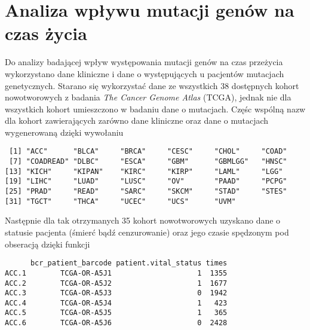 \newpage

\section{Analiza wpływu mutacji genów na czas życia}\label{chap:analiza}

Do analizy badającej wpływ występowania mutacji genów na czas przeżycia
wykorzystano dane kliniczne i dane o występujących u pacjentów mutacjach
genetycznych. Starano się wykorzystać dane ze wszystkich 38 dostępnych
kohort nowotworowych z badania \textit{The Cancer Genome Atlas} (TCGA),
jednak nie dla wszystkich kohort umieszczono w badaniu dane o mutacjach.
Częśc wspólną nazw dla kohort zawierających zarówno dane kliniczne oraz
dane o mutacjach wygenerowaną dzięki wywołaniu

\begin{Shaded}
\begin{Highlighting}[]
\NormalTok{(}\NormalTok{() ->}\StringTok{ }
\end{Highlighting}
\end{Shaded}

\begin{verbatim}
 [1] "ACC"      "BLCA"     "BRCA"     "CESC"     "CHOL"     "COAD"    
 [7] "COADREAD" "DLBC"     "ESCA"     "GBM"      "GBMLGG"   "HNSC"    
[13] "KICH"     "KIPAN"    "KIRC"     "KIRP"     "LAML"     "LGG"     
[19] "LIHC"     "LUAD"     "LUSC"     "OV"       "PAAD"     "PCPG"    
[25] "PRAD"     "READ"     "SARC"     "SKCM"     "STAD"     "STES"    
[31] "TGCT"     "THCA"     "UCEC"     "UCS"      "UVM"     
\end{verbatim}

Następnie dla tak otrzymanych 35 kohort nowotworowych uzyskano dane o
statusie pacjenta (śmierć bądź cenzurowanie) oraz jego czasie spędzonym
pod obseracją dzięki funkcji

\begin{Shaded}
\begin{Highlighting}[]
\NormalTok{(}\StringTok{ }
\end{Highlighting}
\end{Shaded}

\begin{verbatim}
      bcr_patient_barcode patient.vital_status times
ACC.1        TCGA-OR-A5J1                    1  1355
ACC.2        TCGA-OR-A5J2                    1  1677
ACC.3        TCGA-OR-A5J3                    0  1942
ACC.4        TCGA-OR-A5J4                    1   423
ACC.5        TCGA-OR-A5J5                    1   365
ACC.6        TCGA-OR-A5J6                    0  2428
\end{verbatim}

